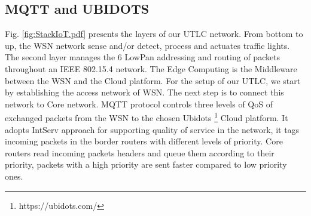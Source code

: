 





\subsection{MQTT and UBIDOTS} \label{Sec:MQTT}

Fig.
\ref{fig:StackIoT.pdf} presents the layers of our UTLC network.
From bottom to up,
	the WSN network sense and/or detect,
	process and actuates traffic lights.
The second layer manages the 6 LowPan addressing and routing of packets throughout an IEEE 802.15.4 network.
The Edge Computing is the Middleware between the WSN and the Cloud platform.
For the setup of our UTLC,
	we start by establishing the access network of WSN.
The next step is to connect this network to Core network.
MQTT protocol controls three levels of QoS of exchanged packets from the WSN to the chosen Ubidots \footnote{https://ubidots.com/} Cloud platform.
It adopts IntServ approach for supporting quality of service in the network,
	it tags incoming packets in the border routers with different levels of priority.
Core routers read incoming packets headers and queue them according to their priority,
	packets with a high priority are sent faster compared to low priority ones.

